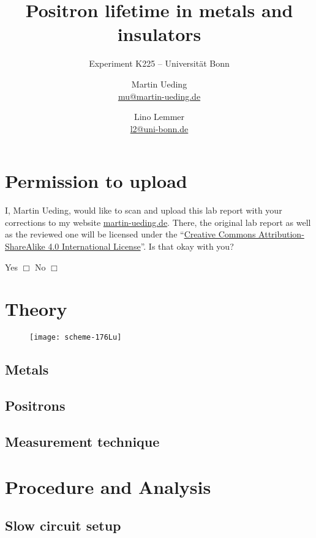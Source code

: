 \documentclass[11pt, english, fleqn, DIV=15, headinclude, BCOR=2cm]{scrreprt}
\title{Positron lifetime in metals and insulators}
\subtitle{Experiment K225 -- Universität Bonn}
\author{%
    Martin Ueding \\
    \small{\href{mailto:mu@martin-ueding.de}{mu@martin-ueding.de}}
    \and
    Lino Lemmer \\
    \small{\href{mailto:l2@uni-bonn.de}{l2@uni-bonn.de}}
}
\date{\daterange{2016-03-24}{2016-03-25}}
\begin{document}
\maketitle

\begin{abstract}
\end{abstract}

\tableofcontents

\chapter*{Permission to upload}

I, Martin Ueding, would like to scan and upload this lab report with your
corrections to my website \href{http://martin-ueding.de}{martin-ueding.de}.
There, the original lab report as well as the reviewed one will be licensed
under the “\href{http://creativecommons.org/licenses/by-sa/4.0/}{Creative
Commons Attribution-ShareAlike 4.0 International License}”. Is that okay with
you?

Yes $\Box$ \hspace{2cm} No $\Box$

\chapter{Theory}

\begin{figure}
    \centering
    \texttt{[image: scheme-176Lu]}
    \caption{%
    }
    \label{fig:scheme-176Lu}
\end{figure}

\section{Metals}

\section{Positrons}

\section{Measurement technique}

\chapter{Procedure and Analysis}

\section{Slow circuit setup}
\end{document}
